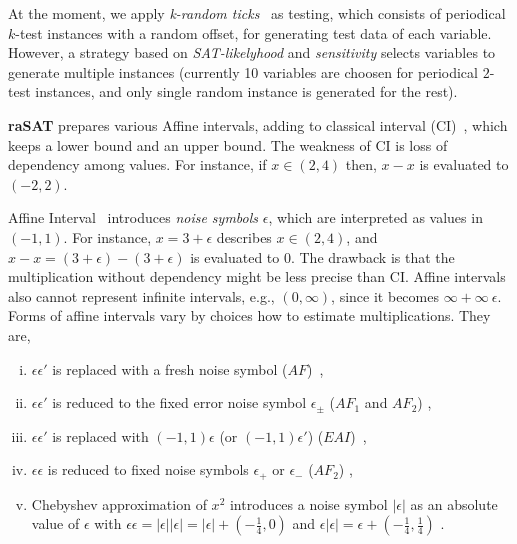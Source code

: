 \documentclass[runningheads,a4paper,oribibl]{llncs}
\begin{document}
At the moment, we apply \emph{k-random ticks}~\cite{tapas12} as testing, 
which consists of periodical $k$-test instances 
with a random offset, for generating test data of each variable.
However, a strategy based on {\em SAT-likelyhood} and {\em sensitivity} selects variables to generate multiple 
instances (currently 10 variables are choosen for periodical $2$-test instances, and only single random 
instance is generated for the rest). 

{\bf raSAT} prepares various Affine intervals, adding to classical interval (CI)~\cite{moore}, 
which keeps a lower bound and an upper bound. The weakness of CI is loss of dependency 
among values. For instance, if $x \in (2,4)$ then, $x - x$ is evaluated to $(-2,2)$.

Affine Interval~\cite{af,comba93} introduces \emph{noise symbols} $\epsilon$, 
which are interpreted as values in $(-1,1)$. 
For instance, $x = 3 + \epsilon$ describes $x \in (2,4)$, and 
$x - x = (3 + \epsilon) - (3 + \epsilon)$ is evaluated to $0$. 
The drawback is that the multiplication without dependency might be less precise than CI.
Affine intervals also cannot represent infinite intervals, e.g., $(0,\infty)$, 
since it becomes $\infty + \infty~\epsilon$. 
Forms of affine intervals vary by choices how to estimate multiplications. They are,
\begin{enumerate}[(i)]
\item $\epsilon \epsilon'$ is replaced with a fresh noise symbol 
($AF$)~\cite{StolfiThesis,comba93}, 
\item $\epsilon \epsilon'$ is reduced to the fixed error noise symbol 
$\epsilon_{\pm}$ ($AF_1$ and $AF_2$) \cite{af},
\item $\epsilon \epsilon'$ is replaced with $(-1,1) \epsilon$ 
(or $(-1,1) \epsilon'$) ($EAI$)~\cite{ngocsefm},
\item $\epsilon \epsilon$ is reduced to fixed noise symbols 
$\epsilon_+$ or $\epsilon_{-}$ ($AF_2$) \cite{af}, 
\item Chebyshev approximation of $x^2$ introduces a noise symbol $|\epsilon|$ 
as an absolute value of $\epsilon$ with 
$\epsilon \epsilon = |\epsilon| |\epsilon| = |\epsilon| + (-\frac{1}{4}, 0)$ and
$\epsilon |\epsilon| = \epsilon + (-\frac{1}{4}, \frac{1}{4})$ \cite{tapas12}. 
\end{enumerate} 
\end{document}
